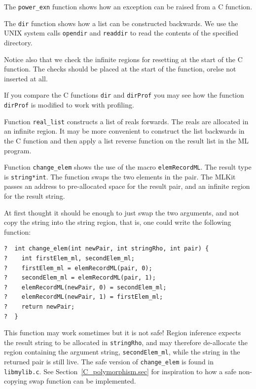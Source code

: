 \documentclass[12pt]{book}
\begin{document}
\begin{example}\label{power_exn.ex}
  The \texttt{power\_exn} function shows how an
  exception can be raised from a C function.
\end{example}

\begin{example}\label{dir.ex}
  The \texttt{dir} function shows how a list can be
  constructed backwards.  We use the UNIX system calls
  \texttt{opendir} and \texttt{readdir} to read the contents of the
  specified directory.
  
  Notice also that we check the infinite regions for resetting at the
  start of the C function. The checks should be placed at the start of
  the function, orelse not inserted at all.
  
  If you compare the C functions \texttt{dir} and \texttt{dirProf} you
  may see how the function \texttt{dirProf} is modified to work with
  profiling.
\end{example}

\begin{example}\label{real_list.ex}
  Function \texttt{real\_list} constructs a list
  of reals forwards. The reals are allocated in an infinite region. It
  may be more convenient to construct the list backwards in the C
  function and then apply a list reverse function on the result list
  in the ML program.
\end{example}

\begin{example}\label{change_elem.ex}
  Function \texttt{change\_elem} shows the use of
  the macro \texttt{elemRecordML}. The result type is \texttt{string*int}. The
  function swaps the two elements in the pair. The MLKit passes an address to
  pre-allocated space for the result pair, and an infinite region for the
  result string.
  
  At first thought it should be enough to just swap the two arguments, and
  not copy the string into the string region, that is, one could write the
  following function:
\begin{verbatim}
?  int change_elem(int newPair, int stringRho, int pair) {
?    int firstElem_ml, secondElem_ml;
?    firstElem_ml = elemRecordML(pair, 0);
?    secondElem_ml = elemRecordML(pair, 1);
?    elemRecordML(newPair, 0) = secondElem_ml;
?    elemRecordML(newPair, 1) = firstElem_ml;
?    return newPair;
?  }
\end{verbatim}
  This function may work sometimes but it is not safe! Region
  inference expects the result string to be allocated in
  \texttt{stringRho}, and may therefore de-allocate the region
  containing the argument string, \verb|secondElem_ml|, while the
  string in the returned pair is still live. The safe version of
  \verb|change_elem| is found in \verb|libmylib.c|. See
  Section~\ref{C_polymorphism.sec} for inspiration to how a safe
  non-copying swap function can be implemented.
\end{example}
                                
\end{document}
